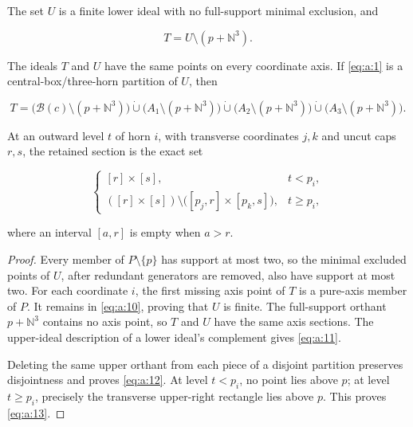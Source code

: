 \begin{corollary}\label{corollary:a:7.1}

The set \(U\) is a finite lower ideal with no full-support minimal exclusion,
and

\begin{equation}
\boxed{T=U\setminus(p+\mathbb N^3).}
\label{eq:a:11}
\end{equation}

The ideals \(T\) and \(U\) have the same points on every coordinate axis.
If \eqref{eq:a:1} is a central-box/three-horn partition of \(U\), then

\begin{equation}
T=
\bigl(\mathcal B(c)\setminus(p+\mathbb N^3)\bigr)
\mathbin{\dot\cup}
\bigl(A_1\setminus(p+\mathbb N^3)\bigr)
\mathbin{\dot\cup}
\bigl(A_2\setminus(p+\mathbb N^3)\bigr)
\mathbin{\dot\cup}
\bigl(A_3\setminus(p+\mathbb N^3)\bigr).
\label{eq:a:12}
\end{equation}

At an outward level \(t\) of horn \(i\), with transverse coordinates
\(j,k\) and uncut caps \(r,s\), the retained section is the exact set

\begin{equation}
\begin{cases}
[r]\times[s], & t<p_i,\\
([r]\times[s])\setminus
   \bigl([p_j,r]\times[p_k,s]\bigr), & t\ge p_i,
\end{cases}
\label{eq:a:13}
\end{equation}

where an interval \([a,r]\) is empty when \(a>r\).

\end{corollary}
\begin{proof}

Every member of \(P\setminus\{p\}\) has support at most two, so the minimal
excluded points of \(U\), after redundant generators are removed, also have
support at most two. For each coordinate \(i\), the first missing axis point
of \(T\) is a pure-axis member of \(P\). It remains in \eqref{eq:a:10}, proving that
\(U\) is finite. The full-support orthant \(p+\mathbb N^3\) contains no axis
point, so \(T\) and \(U\) have the same axis sections. The upper-ideal
description of a lower ideal's complement gives \eqref{eq:a:11}.

Deleting the same upper orthant from each piece of a disjoint partition
preserves disjointness and proves \eqref{eq:a:12}. At level \(t<p_i\), no point lies
above \(p\); at level \(t\ge p_i\), precisely the transverse upper-right
rectangle lies above \(p\). This proves \eqref{eq:a:13}.
\end{proof}

